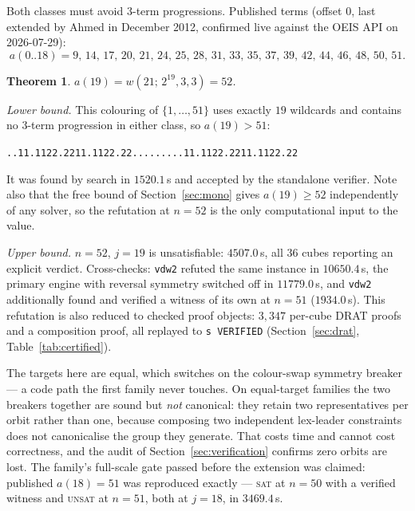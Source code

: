 \documentclass[12pt]{article}
\newtheorem{theorem}{Theorem}
\theoremstyle{remark}
\begin{document}
Both classes must avoid $3$-term progressions. Published terms (offset $0$,
last extended by Ahmed in December 2012, confirmed live against the OEIS API
on 2026-07-29):
\[
a(0..18) = 9,\,14,\,17,\,20,\,21,\,24,\,25,\,28,\,31,\,33,\,35,\,37,\,39,\,42,\,44,\,46,\,48,\,50,\,51 .
\]

\begin{theorem}\label{thm:a217005}
$a(19) = w(21;\,2^{19},3,3) = 52$.
\end{theorem}

\emph{Lower bound.} This colouring of $\{1,\dots,51\}$ uses exactly $19$
wildcards and contains no $3$-term progression in either class, so
$a(19) > 51$:

\begin{center}\small
\texttt{..11.1122.2211.1122.22.........11.1122.2211.1122.22}
\end{center}

\noindent It was found by search in $1520.1$\,s and accepted by the
standalone verifier. Note also that the free bound of
Section~\ref{sec:mono} gives $a(19) \ge 52$ independently of any solver, so
the refutation at $n=52$ is the only computational input to the value.

\emph{Upper bound.} $n=52$, $j=19$ is unsatisfiable: $4507.0$\,s, all $36$
cubes reporting an explicit verdict. Cross-checks: \texttt{vdw2} refuted the
same instance in $10650.4$\,s, the primary engine with reversal symmetry
switched off in $11779.0$\,s, and \texttt{vdw2} additionally found and
verified a witness of its own at $n=51$ ($1934.0$\,s). This refutation is
also reduced to checked proof objects: $3{,}347$ per-cube DRAT proofs and a
composition proof, all replayed to \texttt{s VERIFIED}
(Section~\ref{sec:drat}, Table~\ref{tab:certified}).

The targets here are equal, which switches on the colour-swap symmetry
breaker --- a code path the first family never touches. On equal-target
families the two breakers together are sound but \emph{not} canonical: they
retain two representatives per orbit rather than one, because composing two
independent lex-leader constraints does not canonicalise the group they
generate. That costs time and cannot cost correctness, and the audit of
Section~\ref{sec:verification} confirms zero orbits are lost. The family's
full-scale gate passed before the extension was claimed: published
$a(18)=51$ was reproduced exactly --- \textsc{sat} at $n=50$ with a verified
witness and \textsc{unsat} at $n=51$, both at $j=18$, in $3469.4$\,s.
\end{document}
